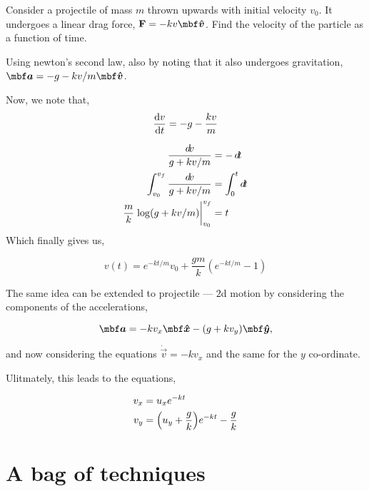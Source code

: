 \begin{example}
    Consider a projectile of mass \(m\) thrown upwards with initial velocity \(v_0\). It undergoes a linear drag 
    force, \(\Vec{F} =  -kv \unitv{v}\). Find the velocity of the particle as 
    a function of time. 
    \begin{soln}
        Using newton's second law, also by noting that 
        it also undergoes gravitation, \(\vec{a} = -g -kv/m \unitv{v}\).

        Now, we note that, 
        \begin{equation*}
            \dv{v}{t} = -g  - \frac{kv}{m}
        \end{equation*}

        \begin{align*}
            \frac{\dd{v}}{g + kv/m} &= - \dd{t} \\
            \int_{v_0}^{v_f} \frac{\dd{v}}{g + kv/m} &= \int_{0}^{t}\dd{t} \\
            \frac{m}{k} \eval{\log(g + kv/m)}_{v_0}^{v_f} &= t \\
        \end{align*}
        Which finally gives us,

        \begin{equation}
            v(t) = e^{-kt/m}v_0 + \frac{gm}{k}(e^{-kt/m} - 1)
        \end{equation}

    \end{soln}
\end{example}

The same idea can be extended to projectile --- \(2\)d motion 
by considering the components of the accelerations,

\[
    \vec{a} = -kv_x \unitv{x} - (g + kv_y) \unitv{y},
\]

and now considering the equations \(\dot{\vec{v}} = -kv_x\)
and the same for the \(y\) co-ordinate. 

Ulitmately, this leads to the equations,

\begin{align}
    v_x &= u_x e^{-kt} \\
    v_y &= \qty(u_y + \frac{g}{k})e^{-kt} - \frac{g}{k}
\end{align}

\section{A bag of techniques}

